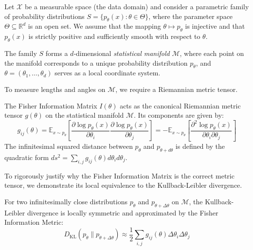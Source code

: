 Let $\mathcal{X}$ be a measurable space (the data domain) and consider a parametric family of probability distributions $S = \{ p_\theta(x) : \theta \in \Theta \}$, where the parameter space $\Theta \subseteq \mathbb{R}^d$ is an open set. We assume that the mapping $\theta \mapsto p_\theta$ is injective and that $p_\theta(x)$ is strictly positive and sufficiently smooth with respect to $\theta$.

\begin{definition}
The family $S$ forms a $d$-dimensional \textit{statistical manifold} $\mathcal{M}$, where each point on the manifold corresponds to a unique probability distribution $p_\theta$, and $\theta = (\theta_1, \dots, \theta_d)$ serves as a local coordinate system.
\end{definition}

To measure lengths and angles on $\mathcal{M}$, we require a Riemannian metric tensor.

\begin{definition}
The Fisher Information Matrix $I(\theta)$ acts as the canonical Riemannian metric tensor $g(\theta)$ on the statistical manifold $\mathcal{M}$. Its components are given by:
\begin{equation}
g_{ij}(\theta) = \mathbb{E}_{x \sim p_\theta} \left[ \frac{\partial \log p_\theta(x)}{\partial \theta_i} \frac{\partial \log p_\theta(x)}{\partial \theta_j} \right] = - \mathbb{E}_{x \sim p_\theta} \left[ \frac{\partial^2 \log p_\theta(x)}{\partial \theta_i \partial \theta_j} \right]
\end{equation}
The infinitesimal squared distance between $p_\theta$ and $p_{\theta + d\theta}$ is defined by the quadratic form $ds^2 = \sum_{i,j} g_{ij}(\theta) d\theta_i d\theta_j$.
\end{definition}

To rigorously justify why the Fisher Information Matrix is the correct metric tensor, we demonstrate its local equivalence to the Kullback-Leibler divergence.

\begin{theorem}
\label{thm:kl_fisher}
For two infinitesimally close distributions $p_\theta$ and $p_{\theta + \Delta \theta}$ on $\mathcal{M}$, the Kullback-Leibler divergence is locally symmetric and approximated by the Fisher Information Metric:
\begin{equation}
D_{\text{KL}}(p_\theta \parallel p_{\theta + \Delta \theta}) \approx \frac{1}{2} \sum_{i,j} g_{ij}(\theta) \Delta \theta_i \Delta \theta_j
\end{equation}
\end{theorem}

